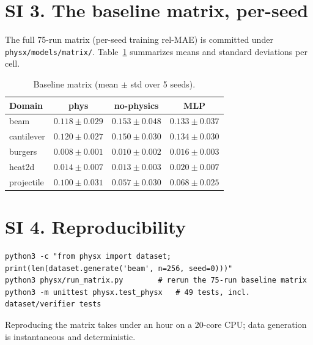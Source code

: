 \documentclass[11pt,a4paper]{article}
\begin{document}
\section*{SI 3. The baseline matrix, per-seed}
\label{si:matrix}

The full 75-run matrix (per-seed training rel-MAE) is committed under
\texttt{physx/models/matrix/}. Table~\ref{tab:seeds} summarizes means and
standard deviations per cell.

\begin{table}[h]
\centering
\caption{Baseline matrix (mean $\pm$ std over 5 seeds).}
\label{tab:seeds}
\small
\begin{tabular}{@{}lccc@{}}
\toprule
Domain & phys & no-physics & MLP \\
\midrule
beam & $0.118\pm0.029$ & $0.153\pm0.048$ & $0.133\pm0.037$ \\
cantilever & $0.120\pm0.027$ & $0.150\pm0.030$ & $0.134\pm0.030$ \\
burgers & $0.008\pm0.001$ & $0.010\pm0.002$ & $0.016\pm0.003$ \\
heat2d & $0.014\pm0.007$ & $0.013\pm0.003$ & $0.020\pm0.007$ \\
projectile & $0.100\pm0.031$ & $0.057\pm0.030$ & $0.068\pm0.025$ \\
\bottomrule
\end{tabular}
\end{table}

\section*{SI 4. Reproducibility}
\label{si:repro}

\begin{verbatim}
python3 -c "from physx import dataset; print(len(dataset.generate('beam', n=256, seed=0)))"
python3 physx/run_matrix.py        # rerun the 75-run baseline matrix
python3 -m unittest physx.test_physx   # 49 tests, incl. dataset/verifier tests
\end{verbatim}

Reproducing the matrix takes under an hour on a 20-core CPU; data generation
is instantaneous and deterministic.
\end{document}
